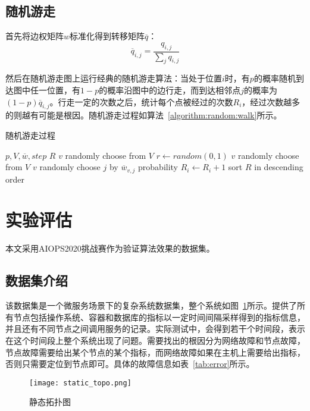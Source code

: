 \subsection{随机游走}
首先将边权矩阵$w$标准化得到转移矩阵$\overline{q}$：
\begin{equation*}
  \overline{q}_{i,j} = \frac{q_{i,j}}{\sum_jq_{i,j}}
\end{equation*}

然后在随机游走图上运行经典的随机游走算法：当处于位置$i$时，有$p$的概率随机到达图中任一位置，有$1-p$的概率沿图中的边行走，而到达相邻点$j$的概率为$(1-p)\overline{q}_{i,j}$。行走一定的次数之后，统计每个点被经过的次数$R_i$，经过次数越多的则越有可能是根因。随机游走过程如算法~\ref{algorithm:random:walk}所示。

\begin{algorithm}
  \caption{随机游走过程}
  \begin{algorithmic}[1]
      \Require $p,V,\overline{w},step$
      \Ensure $R$
      \State $v$ \gets randomly choose from $V$
      \Repeat
      \State $r \gets random(0,1)$
        \State $v$ \gets randomly choose from $V$
      \Else
        \State $v$ \gets randomly choose $j$ by $\overline{w}_{v,j}$ probability
      \EndIf
      \State $R_i \gets R_i + 1 $
      \State sort $R$ in descending order
  \end{algorithmic}
  \label{algorithm:random:walk}
\end{algorithm}
\section{实验评估}
本文采用AIOPS2020挑战赛作为验证算法效果的数据集。

\subsection{数据集介绍}

该数据集是一个微服务场景下的复杂系统数据集，整个系统如图~\ref{fig:static_topo}所示。提供了所有节点包括操作系统、容器和数据库的指标以一定时间间隔采样得到的指标信息，并且还有不同节点之间调用服务的记录。实际测试中，会得到若干个时间段，表示在这个时间段上整个系统出现了问题。需要找出的根因分为网络故障和节点故障，节点故障需要给出某个节点的某个指标，而网络故障如果在主机上需要给出指标，否则只需要定位到节点即可。具体的故障信息如表~\ref{tab:error}所示。

\begin{figure}[htbp]
    \centering
    \texttt{[image: static\_topo.png]}
    \caption{静态拓扑图}
    \label{fig:static_topo}
  \end{figure}

